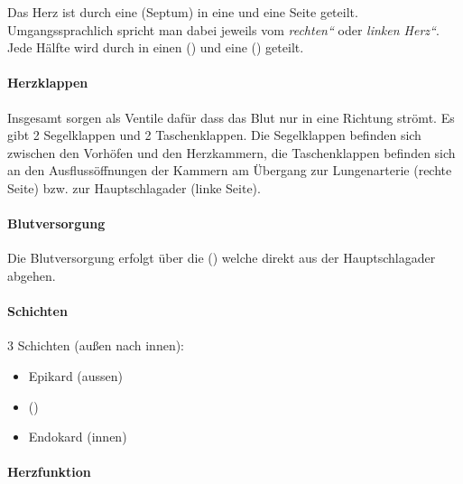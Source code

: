 Das Herz ist durch eine  (Septum) in eine
 und eine  Seite geteilt.
Umgangssprachlich spricht man dabei jeweils vom
\emph{{\quotedblbase}rechten{\textquotedblleft}} oder
\emph{{\quotedblbase}linken Herz{\textquotedblleft}}. Jede
H\"alfte wird durch  in einen 
() und eine  ()
geteilt.

\paragraph{Herzklappen}

 Insgesamt 
sorgen als Ventile daf\"ur dass das Blut nur in eine Richtung str\"omt. Es gibt 2 Segelklappen und 2 Taschenklappen.
Die Segelklappen befinden sich zwischen den Vorh\"ofen und den
Herzkammern, die Taschenklappen befinden sich an den
Ausfluss\"offnungen der Kammern am \"Ubergang zur Lungenarterie (rechte
Seite) bzw. zur Hauptschlagader (linke Seite). 

\paragraph{Blutversorgung}

Die Blutversorgung erfolgt \"uber die
 () welche
direkt aus der Hauptschlagader abgehen.

\paragraph{Schichten}

3 Schichten (au{\ss}en nach innen):
\begin{itemize}
\item Epikard (aussen)
\item {} ()
\item Endokard (innen)
\end{itemize}



\paragraph{Herzfunktion}\label{topic:herzfunktion}

